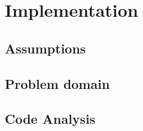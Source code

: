 \section{Implementation}

\subsection{Assumptions}

\subsection{Problem domain}

\subsection{Code Analysis}